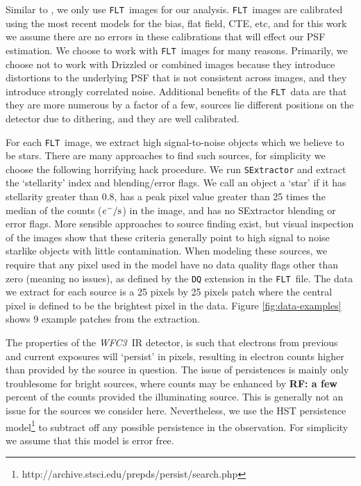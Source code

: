 \documentclass[12pt,letterpaper,preprint]{aastex}
\newcommand{\instrument}[1]{\textsl{#1}}
\newcommand{\rf}[1]{\textbf{RF: #1}}
\newcommand{\WFC}{\instrument{WFC3}}
\newcommand{\FLT}{\texttt{FLT}}
\begin{document}
Similar to \citet{anderson06}, we only use \FLT\ images for our analysis.  \FLT\ images are calibrated 
using the most recent models for the bias, flat field, CTE, etc, and for this work we assume there are 
no errors in these calibrations that will effect our PSF estimation.  We choose to work with \FLT\
images for many reasons.  Primarily, we choose not to work with Drizzled or combined images
because they introduce distortions to the underlying PSF that is not consistent across images, and 
they introduce strongly correlated noise.  Additional benefits of the \FLT\ data are that they are 
more numerous by a factor of a few, sources lie different positions on the detector due to dithering, 
and they are well calibrated.  

For each \FLT\ image, we extract high signal-to-noise objects which we believe to be stars.  There 
are many approaches to find such sources, for simplicity we choose the following horrifying hack 
procedure.  We run \texttt{SExtractor} \citep{bertin96} and extract the `stellarity' index and blending/error 
flags.  We call an object a `star' if it has stellarity greater than 0.8, has a peak pixel value greater than 25
times the median of the counts ($e^- / \rm{s}$) in the image, and has no SExtractor blending or 
error flags.  More sensible approaches to source finding exist, but visual inspection of the images 
show that these criteria generally point to high signal to noise starlike objects with little contamination.
When modeling these sources, we require that any pixel used in the model have no data quality 
flags other than zero (meaning no issues), as defined by the \texttt{DQ} extension in the \FLT\ file.  
The data we extract for each source is a 25 pixels by 25 pixels patch where the central pixel is defined
to be the brightest pixel in the data.  Figure \ref{fig:data-examples} shows 9 example patches from the 
extraction.

The properties of the \WFC\ IR detector, is such that electrons from previous and current exposures 
will `persist' in pixels, resulting in electron counts higher than provided by the source in question.  
The issue of persistences is mainly only troublesome for bright sources, where counts may be 
enhanced by \rf{a few} percent of the counts provided the illuminating source.  This is generally 
not an issue for the sources we consider here.  Nevertheless, we use the HST persistence 
model\footnote{http://archive.stsci.edu/prepds/persist/search.php} to subtract off any possible 
persistence in the observation.  For simplicity we assume that this model is error free.
\end{document}
